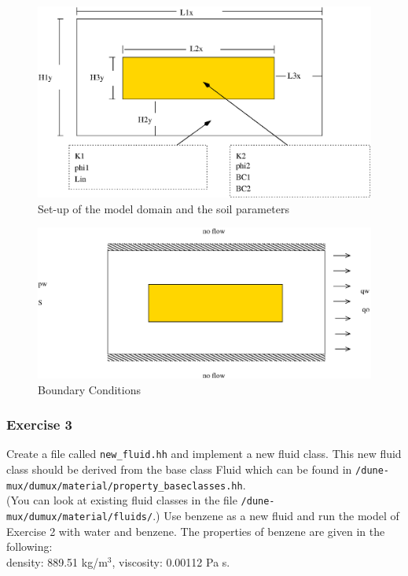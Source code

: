 \begin{figure}[h]
\centering
\includegraphics[width=0.8\linewidth,keepaspectratio]{EPS/Ex2_Domain.eps}
\caption{Set-up of the model domain and the soil parameters}\label{tutorial-deoucpled:ex2_Domain}
\end{figure}

\begin{figure}[h]
\centering
\includegraphics[width=0.8\linewidth,keepaspectratio]{EPS/Ex2_Boundary.eps}
\caption{Boundary Conditions}\label{tutorial-deoucpled:ex2_BC}
\end{figure}

\subsubsection{Exercise 3}
Create a file called \texttt{new\_fluid.hh} and implement a new fluid class. This new fluid class should be derived from the base class Fluid which can be found in  \texttt{/dune-mux/dumux/material/property\_baseclasses.hh}. \\
(You can look at existing fluid classes in the file \texttt{/dune-mux/dumux/material/fluids/}.)
Use benzene as a new fluid and run the model of Exercise 2 with water and benzene. The properties of benzene are given in the following: \\
density: 889.51 kg/$\text{m}^3$, viscosity: 0.00112 Pa s. 
